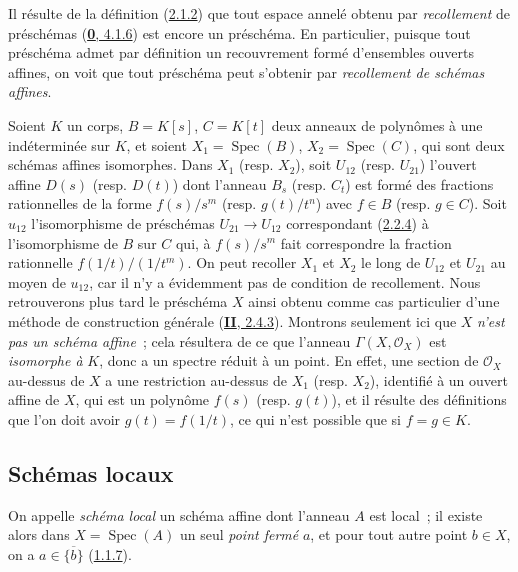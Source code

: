 \begin{env}[2.3.1]
\label{I.2.3.1-fr}
Il résulte de la définition (\hyperref[I.2.1.2-fr]{2.1.2}) que tout espace
annelé obtenu par \emph{recollement} de préschémas
(\hyperref[0.4.1.6-fr]{\textbf{0}, 4.1.6}) est encore un préschéma. En particulier,
puisque tout préschéma admet par définition un recouvrement formé d'ensembles
ouverts affines, on voit que tout préschéma peut s'obtenir par
\emph{recollement de schémas affines}.
\end{env}

\begin{example}[2.3.2]
\label{I.2.3.2-fr}
Soient $K$ un corps, $B=K[s]$, $C=K[t]$ deux anneaux de polynômes à une
indéterminée sur $K$, et soient $X_1=\operatorname{Spec}(B)$,
$X_2=\operatorname{Spec}(C)$, qui sont deux schémas affines isomorphes. Dans
$X_1$ (resp. $X_2$), soit $U_{12}$ (resp. $U_{21}$) l'ouvert affine $D(s)$
(resp. $D(t)$) dont l'anneau $B_s$ (resp. $C_t$) est formé des fractions
rationnelles de la forme $f(s)/s^m$ (resp. $g(t)/t^n$) avec $f\in B$
(resp. $g\in C$). Soit $u_{12}$ l'isomorphisme de préschémas
$U_{21}\to U_{12}$ correspondant (\hyperref[I.2.2.4-fr]{2.2.4}) à
l'isomorphisme de $B$ sur $C$ qui, à $f(s)/s^m$ fait correspondre la
fraction rationnelle $f(1/t)/(1/t^m)$. On peut recoller $X_1$ et $X_2$ le long
de $U_{12}$ et $U_{21}$ au moyen de $u_{12}$, car il n'y a évidemment pas de
condition de recollement. Nous retrouverons plus tard le préschéma $X$ ainsi
obtenu comme cas particulier d'une méthode de construction générale
(\hyperref[II.2.4.3-fr]{\textbf{II}, 2.4.3}). Montrons seulement ici que $X$ \emph{n'est
pas un schéma affine}~; cela résultera de ce que l'anneau
$\Gamma(X,\mathscr{O}_X)$ est \emph{isomorphe à} $K$, donc a un spectre réduit
à un point. En effet, une section de $\mathscr{O}_X$ au-dessus de $X$ a une
restriction au-dessus de $X_1$ (resp. $X_2$), identifié à un ouvert affine de
$X$, qui est un polynôme $f(s)$ (resp. $g(t)$), et il résulte des définitions
que l'on doit avoir $g(t)=f(1/t)$, ce qui n'est possible que si $f=g\in K$.
\end{example}

\subsection{Schémas locaux}
\label{subsection:I.2.4-fr}

\begin{env}[2.4.1]
\label{I.2.4.1-fr}
On appelle \emph{schéma local} un schéma affine dont l'anneau $A$ est local~;
il existe alors dans $X=\operatorname{Spec}(A)$ un seul \emph{point fermé}
$a$, et pour tout autre point $b\in X$, on a
$a\in\overline{\{b\}}$ (\hyperref[I.1.1.7-fr]{1.1.7}).
\end{env}

